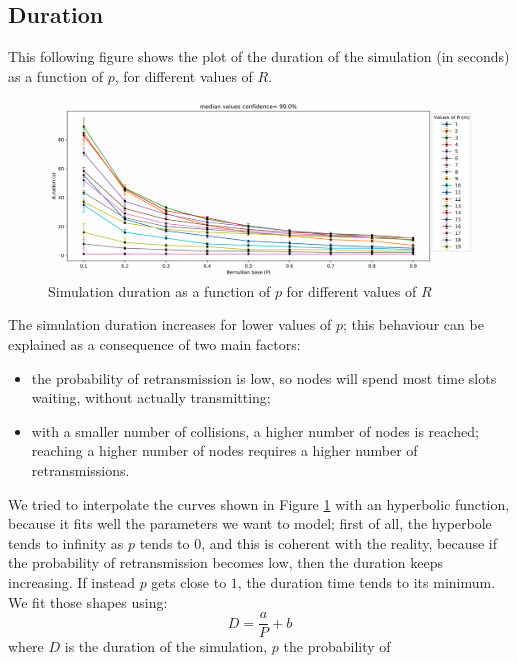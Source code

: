 \subsection{Duration}
This following figure shows the plot of the duration of the simulation (in
seconds) as a function of $p$, for different values of $R$.
\begin{figure}[H]
    \begin{center}
        \includegraphics[scale=.51]{img/Big_DurP_median.pdf}
    \end{center}
    \vspace*{-0.5cm}
    \caption{Simulation duration as a function of $p$ for different values of $R$}
    \label{fig:floorplancoverage3}
\end{figure}
\noindent
The simulation duration increases for lower values of $p$; this behaviour can be
explained as a consequence of two main factors:
\begin{itemize}
    \item the probability of retransmission is low, so nodes will spend most
    time slots waiting, without actually transmitting;
    \item with a smaller number of collisions, a higher number of nodes is
    reached; reaching a higher number of nodes requires a higher number of
    retransmissions.
\end{itemize}
We tried to interpolate the curves shown in Figure \ref{fig:floorplancoverage3}
with an hyperbolic function, because it fits well the parameters we want to
model; first of all, the hyperbole tends to infinity as $p$ tends to $0$, and
this is coherent with the reality, because if the probability of retransmission
becomes low, then the duration keeps increasing. If instead $p$ gets close to
$1$, the duration time tends to its minimum. We fit those shapes using:
\begin{equation*}  
    D = \frac{a}{P}+b 
\end{equation*}
where $D$ is the duration of the simulation, $p$ the probability of
